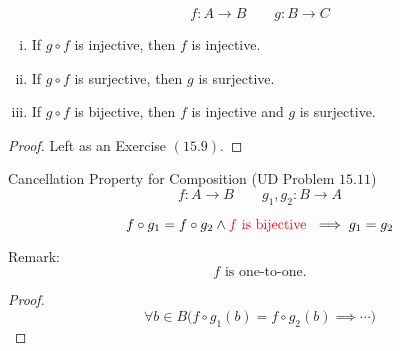 \begin{frame}{}
  \begin{theorem}
    \[
      f: A \to B \qquad g: B \to C
    \]

    \begin{enumerate}[(i)]
      \item If $g \circ f$ is injective, then $f$ is injective.
      \item If $g \circ f$ is surjective, then $g$ is surjective.
      \item If $g \circ f$ is bijective, then $f$ is injective and $g$ is surjective.
    \end{enumerate}
  \end{theorem}

  \pause
  \vspace{0.60cm}
  \begin{proof}
    \centerline{Left as an Exercise $(15.9)$.}
  \end{proof}
\end{frame}

\begin{frame}{}
  \begin{exampleblock}{Cancellation Property for Composition (UD Problem $15.11$)}
    \[
      f: A \to B \qquad g_1, g_2: B \to A
    \]

    \[
      f \circ g_1 = f \circ g_2 \land \textcolor{red}{f \text{ is bijective }} \implies g_1 = g_2
    \]
  \end{exampleblock}

  \pause
  \vspace{0.60cm}
  \begin{alertblock}{Remark:}
    \[
      f \text{ is one-to-one}.
    \]
  \end{alertblock}

  \pause
  \vspace{0.60cm}
  \begin{proof}
    \pause
    \[
      \forall b \in B \Big( f \circ g_1 (b) = f \circ g_2 (b) \implies \cdots \Big)
    \]
  \end{proof}
\end{frame}
